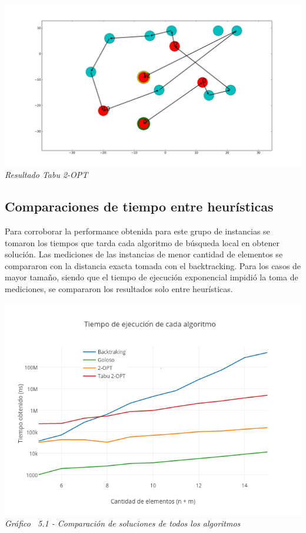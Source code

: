     \vspace*{0.3cm} \vspace*{0.3cm}
  \begin{center}
\includegraphics[scale=0.3]{./EJ5/caminoTabu.png}
\\{\textit{Resultado Tabu 2-OPT}}
  \end{center}
  \vspace*{0.3cm}


\subsection{Comparaciones de tiempo entre heurísticas}

Para corroborar la performance obtenida para este grupo de instancias se tomaron los tiempos que tarda cada algoritmo de búsqueda local en obtener soluci\'on. 
 Las mediciones de las instancias de menor cantidad de elementos se compararon con la distancia exacta tomada con el backtracking. Para los casos de mayor tamaño, siendo que el tiempo de ejecución exponencial impidió la toma de mediciones, se compararon los resultados solo entre heurísticas.


\vspace*{0.3cm} \vspace*{0.3cm}
  \begin{center}
 \includegraphics[scale=0.5]{./EJ5/medicionTodos.png}\\
 {\textit{Gráfico \ 5.1 - Comparaci\'on de soluciones de todos los algoritmos}}
  \end{center}
  \vspace*{0.3cm}


